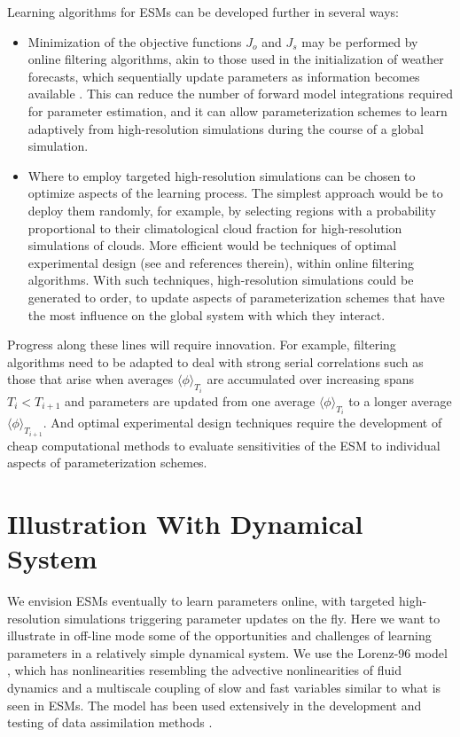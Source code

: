 \documentclass[draft]{agujournal}
\begin{document}
Learning algorithms for ESMs can be developed further in several ways:
\begin{itemize}
\item Minimization of the objective functions $J_o$ and $J_s$ may be performed by online filtering algorithms, akin to those used in the initialization of weather forecasts, which sequentially update parameters as information becomes available \citep{Law15a}. This can reduce the number of forward model integrations required for parameter estimation, and it can allow parameterization schemes to learn adaptively from high-resolution simulations during the course of a global simulation. 
\item Where to employ targeted high-resolution simulations can be chosen to optimize aspects of the learning process. The simplest approach would be to deploy them randomly, for example, by selecting regions with a probability proportional to their climatological cloud fraction for high-resolution simulations of clouds. More efficient would be techniques of optimal experimental design (see \citet{Alexanderian16a}
and references therein), within online filtering algorithms. With such techniques, high-resolution simulations could be generated to order, to update aspects of parameterization schemes that have the most influence on the global system with which they interact. 
\end{itemize}
Progress along these lines will require innovation. For example, filtering algorithms need to be adapted to deal with strong serial correlations such as those that arise when averages $\langle \phi \rangle_{T_i}$ are accumulated over increasing spans $T_i < T_{i+1}$ and parameters are updated from one average $\langle \phi \rangle_{T_i}$ to a longer average $\langle \phi \rangle_{T_{i+1}}$. And optimal experimental design techniques require the development of cheap computational methods to evaluate sensitivities of the ESM to individual aspects of parameterization schemes.
  
\section{Illustration With Dynamical System}\label{s:lorenz96}

We envision ESMs eventually to learn parameters online, with targeted high-resolution simulations triggering parameter updates on the fly. Here we want to illustrate in off-line mode some of the opportunities and challenges of learning parameters in a relatively simple dynamical system. We use the Lorenz-96 model \citep{Lorenz96a}, which has nonlinearities resembling the advective nonlinearities of fluid dynamics and a multiscale coupling of slow and fast variables similar to what is seen in ESMs. The model has been used extensively in the development and testing of data assimilation methods \citep[e.g.,][]{Lorenz98a, Anderson01a, Ott04a}. 
\end{document}
